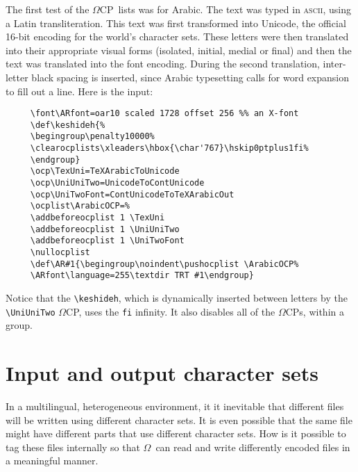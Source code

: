 \documentclass[fleqn]{article}
\newcommand{\OMEGA}{$\Omega$}
\newcommand{\OCP}{\OMEGA CP}
\begin{document}
The first test of the \OCP\ lists was for Arabic.  The text was typed
in \textsc{ascii}, using a Latin transliteration.  This text was first
transformed into Unicode, the official 16-bit encoding for the 
world's character sets.  These letters were then translated into
their appropriate visual forms (isolated, initial, medial or final)
and then the text was translated into the font encoding.  During the
second translation, inter-letter black spacing is inserted, since Arabic
typesetting calls for word expansion to fill out a line.  Here is the
input:
\begin{verbatim}
     \font\ARfont=oar10 scaled 1728 offset 256 %% an X-font
     \def\keshideh{%
     \begingroup\penalty10000%
     \clearocplists\xleaders\hbox{\char'767}\hskip0ptplus1fi%
     \endgroup}
     \ocp\TexUni=TeXArabicToUnicode
     \ocp\UniUniTwo=UnicodeToContUnicode
     \ocp\UniTwoFont=ContUnicodeToTeXArabicOut
     \ocplist\ArabicOCP=%
     \addbeforeocplist 1 \TexUni
     \addbeforeocplist 1 \UniUniTwo
     \addbeforeocplist 1 \UniTwoFont
     \nullocplist
     \def\AR#1{\begingroup\noindent\pushocplist \ArabicOCP%
     \ARfont\language=255\textdir TRT #1\endgroup}
\end{verbatim}
Notice that the \verb|\keshideh|, which is dynamically inserted
between letters by the \verb|\UniUniTwo| \OCP, uses the \verb|fi|
infinity.  It also disables all of the \OCP s, within a group.

\section{Input and output character sets}

In a multilingual, heterogeneous environment, it it inevitable that
different files will be written using different character sets.  It
is even possible that the same file might have different parts that
use different character sets.  How is it possible to tag
these files internally so that \OMEGA\ can read and write differently
encoded files in a meaningful manner.
\end{document}
